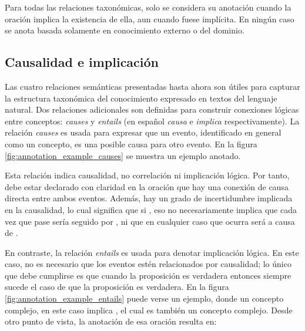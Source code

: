 Para todas las relaciones taxonómicas, solo se considera su anotación cuando la oración implica la existencia de ella, aun cuando fuese implícita. En ningún caso se anota basada solamente en conocimiento externo o del dominio.

\subsection{Causalidad e implicación}
Las cuatro relaciones semánticas presentadas hasta ahora son útiles para capturar la estructura taxonómica del conocimiento expresado en textos del lenguaje natural. Dos relaciones adicionales son definidas para construir conexiones lógicas entre conceptos: \textit{causes} y \textit{entails} (en español \textit{causa} e \textit{implica} respectivamente). La relación \textit{causes} es usada para expresar que un evento, identificado en general como un concepto, es una posible causa para otro evento. En la figura \ref{fig:annotation_example_causes} se muestra un ejemplo anotado.

Esta relación indica causalidad, no correlación ni implicación lógica. Por tanto, debe estar declarado con claridad en la oración que hay una conexión de causa directa entre ambos eventos. Además, hay un grado de incertidumbre implicada en la causalidad, lo cual significa que si , eso no necesariamente implica que cada vez que pase  sería seguido por , ni que en cualquier caso que ocurra  será a causa de .

En contraste, la relación \textit{entails} es usada para denotar implicación lógica. En este caso, no es necesario que los eventos estén relacionados por causalidad; lo único que debe cumplirse es que cuando la proposición  es verdadera entonces siempre sucede el caso de que la proposición  es verdadera. En la figura \ref{fig:annotation_example_entails} puede verse un ejemplo, donde un concepto complejo, en este caso  implica , el cual es también un concepto complejo. Desde otro punto de vista, la anotación de esa oración resulta en:

\vspace{-0.05in}
\begin{center}
\end{center}


